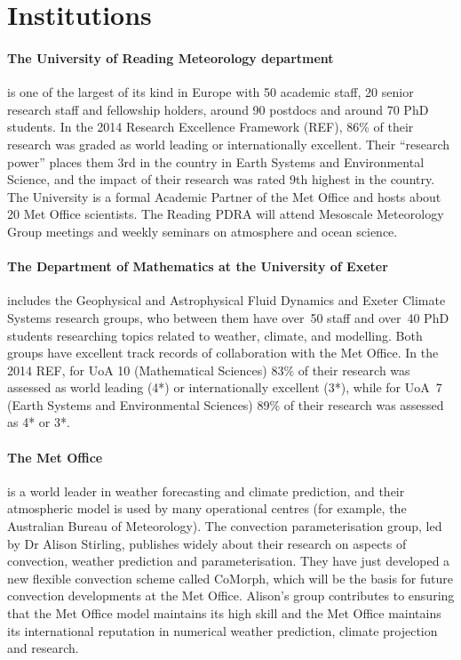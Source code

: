 \documentclass[11pt,a4paper]{article}
\begin{document}
\section*{Institutions}

\paragraph*{The University of Reading Meteorology department} is one of the largest of its kind in Europe with 50 academic staff, 20 senior research staff and fellowship holders, around 90 postdocs and around 70 PhD students. In the 2014 Research Excellence Framework (REF), 86\% of their research was graded as world leading or internationally excellent. Their ``research power'' places them 3rd in the country in Earth Systems and Environmental Science, and the impact of their research was rated 9th highest in the country. The University is a formal Academic Partner of the Met Office and hosts about 20 Met Office scientists. The Reading PDRA will attend Mesoscale Meteorology Group meetings and weekly seminars on atmosphere and ocean science.

\paragraph*{The Department of Mathematics at the University of Exeter} includes the Geophysical and Astrophysical Fluid Dynamics and Exeter Climate Systems research groups, who between them have over~50 staff and over~40 PhD students researching topics related to weather, climate, and modelling. Both groups have excellent track records of collaboration with the Met Office. In the 2014 REF, for UoA 10 (Mathematical Sciences) 83\% of their research was assessed as world leading (4*) or internationally excellent (3*), while for UoA~7 (Earth Systems and Environmental Sciences) 89\% of their research was assessed as 4* or 3*.

\paragraph*{The Met Office} is a world leader in weather forecasting and climate prediction, and their atmospheric model is used by many operational centres (for example, the Australian Bureau of Meteorology). The convection parameterisation group, led by Dr Alison Stirling, publishes widely about their research on aspects of convection, weather prediction and parameterisation. They have just developed a new flexible convection scheme called CoMorph, which will be the basis for future convection developments at the Met Office. Alison's group contributes to ensuring that the Met Office model maintains its high skill and the Met Office maintains its international reputation in numerical weather prediction, climate projection and research. 
\end{document}
